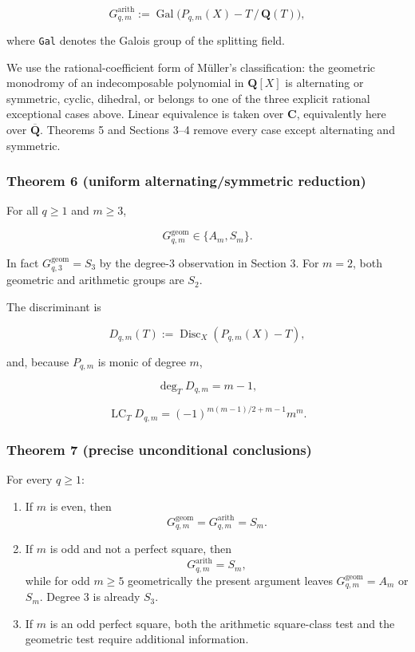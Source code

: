 \documentclass[11pt]{article}
\theoremstyle{keio}
\theoremstyle{definition}
\theoremstyle{remark}
\providecommand{\tightlist}{\setlength{\itemsep}{0pt}\setlength{\parskip}{0pt}}
\begin{document}
\[
 G^{\mathrm{arith}}_{q,m}
 :=\operatorname {Gal}
 \bigl(P_{q,m}(X)-T\,/\,\mathbf Q(T)\bigr),
\]

where \texttt{Gal} denotes the Galois group of the splitting field.

We use the rational-coefficient form of Müller's classification: the
geometric monodromy of an indecomposable polynomial in \(\mathbf Q[X]\) is
alternating or symmetric, cyclic, dihedral, or belongs to one of the three
explicit rational exceptional cases above. Linear equivalence is taken over
\(\mathbf C\), equivalently here over \(\overline{\mathbf Q}\). Theorems 5
and Sections 3--4 remove every case except alternating and symmetric.

\subsubsection{Theorem 6 (uniform alternating/symmetric reduction)}

For all \(q\geq1\) and \(m\geq3\),

\[
 G^{\mathrm{geom}}_{q,m}\in\{A_m,S_m\}.
\]

In fact \(G^{\mathrm{geom}}_{q,3}=S_3\) by the degree-3 observation in
Section 3. For \(m=2\), both geometric and arithmetic groups are \(S_2\).

The discriminant is

\[
 D_{q,m}(T):=\operatorname {Disc}_X(P_{q,m}(X)-T),
\]

and, because \(P_{q,m}\) is monic of degree \(m\),

\[
 \deg_TD_{q,m}=m-1,
\]

\[
 \operatorname {LC}_T D_{q,m}
 =(-1)^{m(m-1)/2+m-1}m^m.
\]

\subsubsection{Theorem 7 (precise unconditional conclusions)}

For every \(q\geq1\):

\begin{enumerate}
\def\labelenumi{\arabic{enumi}.}
\tightlist
\item
  If \(m\) is even, then
  \[
  G^{\mathrm{geom}}_{q,m}
  =G^{\mathrm{arith}}_{q,m}=S_m.
  \]
\item
  If \(m\) is odd and not a perfect square, then
  \[
  G^{\mathrm{arith}}_{q,m}=S_m,
  \]
  while for odd \(m\ge5\) geometrically the present argument leaves
  \(G^{\mathrm{geom}}_{q,m}=A_m\) or \(S_m\). Degree \(3\) is already
  \(S_3\).
\item
  If \(m\) is an odd perfect square, both the arithmetic square-class test
  and the geometric test require additional information.
\end{enumerate}
\end{document}
